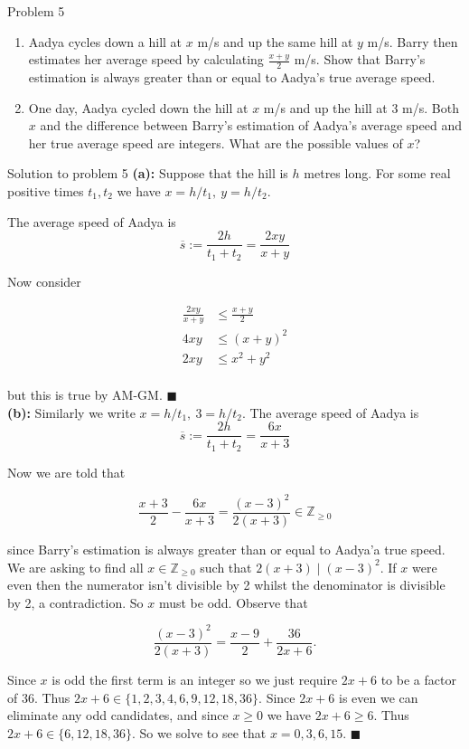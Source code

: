 \documentclass{article}
\begin{document}
\begin{problem}{Problem 5}
\begin{enumerate}[label=(\alph*)]
\item Aadya cycles down a hill at $x$ m/s and up the same hill at $y$ m/s. Barry then estimates her average
speed by calculating $\frac{x+y}{2}$ m/s.
Show that Barry’s estimation is always greater than or equal to Aadya’s true average speed.
\item One day, Aadya cycled down the hill at $x$ m/s and up the hill at 3 m/s. Both $x$ and the difference
between Barry’s estimation of Aadya’s average speed and her true average speed are integers. What are the possible values of $x$?
\end{enumerate}
\end{problem}

\begin{solution}{Solution to problem 5}
\textbf{(a):} Suppose that the hill is $h$ metres long. For some real
positive times $t_1,t_2$ we have
$
x = h/t_1,\ y = h/t_2.
$

The average speed of Aadya is
$$
\overline{s}:=\frac{2h}{t_1 + t_2} = \frac{2xy}{x+y}
$$

Now consider

\[
\begin{aligned}
\frac{2xy}{x+y} &\leq \frac{x+y}{2} \\
4xy &\leq (x+y)^2 \\
2xy &\leq x^2 + y^2 \\
\end{aligned}
\]


but this is true by AM-GM. $\blacksquare$
\\

\textbf{(b):} Similarly we write $x=h/t_1,\ 3=h/t_2$. The average speed of
Aadya is
$$
\overline{s} := \frac{2h}{t_1+t_2} = \frac{6x}{x+3}
$$

Now we are told that

$$
\frac{x+3}{2} - \frac{6x}{x+3} = \frac{(x-3)^2}{2(x+3)} \in
\mathbb{Z}_{\geq 0}
$$

since Barry's estimation is always greater than or equal to Aadya'a true
speed. We are asking to find all $x \in
\mathbb{Z}_{\geq 0}$ such that $2(x+3) \mid (x-3)^2$. If $x$ were even
then the numerator isn't divisible by 2 whilst the denominator is divisible
by 2, a contradiction. So $x$ must be odd. Observe that

$$
\frac{(x-3)^2}{2(x+3)} = \frac{x-9}{2} + \frac{36}{2x+6}.
$$

Since $x$ is odd the first term is an integer so we just require
$2x+6$ to be a factor of 36. Thus $2x+6 \in
\{ 1,2,3,4,6,9,12,18,36 \}$. Since $2x+6$ is even we can eliminate any odd
candidates, and since $x\geq0$ we have $2x+6\geq 6$. Thus
$2x+6 \in \{ 6,12,18,36\}$. So we solve to see that
$x=0,3,6,15$. $\blacksquare$
\end{solution}
\vspace{0.5cm}
\newpage
\end{document}
